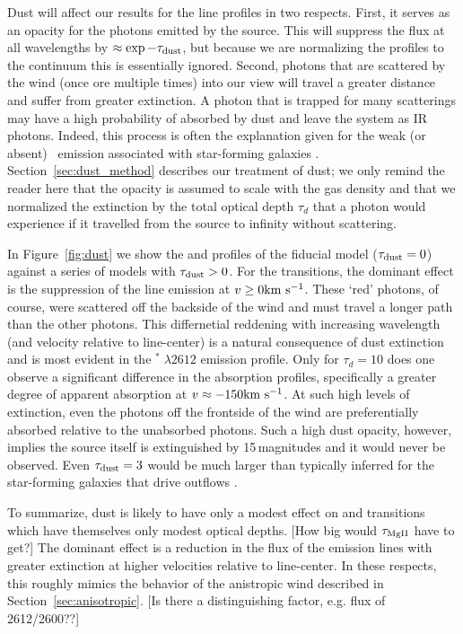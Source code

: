 \documentclass[12pt,preprint]{aastex}
\begin{document}
Dust will affect our results for the line profiles in two respects.
First, it serves as an opacity for the photons
emitted by the source.  This will suppress the flux at all
wavelengths by $\approx \exp{-\tau_{\rm dust}}$, but because we are normalizing the profiles to the
continuum this is essentially ignored.  Second, photons that are
scattered by the wind (once ore multiple times) into our view will travel a greater
distance and suffer from greater extinction.  A photon that is
trapped for many scatterings may have a high probability of absorbed
by dust and leave the system as IR photons.  Indeed, this process is
often the explanation given for the weak (or absent) \lya\ emission
associated with star-forming galaxies \citep[e.g.][]{lya}.
Section~\ref{sec:dust_method} describes our treatment of dust; we only
remind the reader here that the opacity is assumed to scale with the
gas density and that we normalized the extinction by the total optical
depth $\tau_d$ that a photon would experience if it travelled from the
source to infinity without scattering. 

In Figure~\ref{fig:dust} we show the  and 
profiles of the fiducial model ($\tau_{\rm dust} = 0$) against a series of
models with $\tau_{\rm dust} > 0$.  For the  transitions, the
dominant effect is the suppression of the line emission at $v \ge 0
{\rm km~s^{-1}}$.  These `red' photons, of course, were scattered off the
backside of the wind and must travel a longer path than the other
photons.  This differnetial reddening with increasing wavelength (and
velocity relative to line-center) is a natural consequence of dust
extinction and is most evident in the $^* \; \lambda 2612$
emission profile.   Only for $\tau_d = 10$ does one observe a
significant difference in the absorption profiles, specifically a
greater degree of apparent absorption at $v \approx -150 {\rm km~s^{-1}}$.  At
such high levels of extinction, even the photons off the frontside of the
wind are preferentially absorbed relative to the unabsorbed photons.
Such a high dust opacity, however, implies the source itself is
extinguished by 15\,magnitudes and it would never be observed. 
Even $\tau_{\rm dust} = 3$ would be much larger than typically inferred for the
star-forming galaxies that drive outflows \citep[e.g.][]{dust}.

To summarize,  dust is likely to have only a modest effect on
 and  transitions which have themselves only
modest optical depths.  [How big would $\tau_{\rm MgII}$ have to get?]
The dominant effect is a reduction in the flux of the emission lines
with greater extinction at higher velocities relative to line-center.
In these respects, this roughly mimics the behavior of the anistropic
wind described in Section~\ref{sec:anisotropic}. [Is there a
distinguishing factor, e.g. flux of 2612/2600??]
\end{document}

